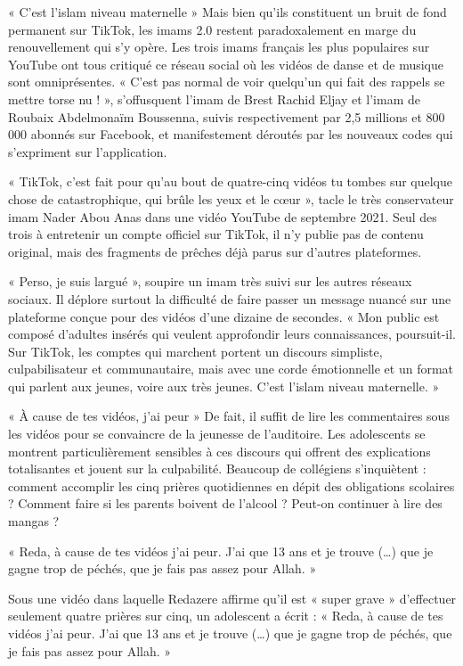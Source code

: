 « C’est l’islam niveau maternelle »
Mais bien qu’ils constituent un bruit de fond permanent sur TikTok, les imams 2.0 restent paradoxalement en marge du renouvellement qui s’y opère. Les trois imams français les plus populaires sur YouTube ont tous critiqué ce réseau social où les vidéos de danse et de musique sont omniprésentes. « C’est pas normal de voir quelqu’un qui fait des rappels se mettre torse nu ! », s’offusquent l’imam de Brest Rachid Eljay et l’imam de Roubaix Abdelmonaïm Boussenna, suivis respectivement par 2,5 millions et 800 000 abonnés sur Facebook, et manifestement déroutés par les nouveaux codes qui s’expriment sur l’application.
 
« TikTok, c’est fait pour qu’au bout de quatre-cinq vidéos tu tombes sur quelque chose de catastrophique, qui brûle les yeux et le cœur », tacle le très conservateur imam Nader Abou Anas dans une vidéo YouTube de septembre 2021. Seul des trois à entretenir un compte officiel sur TikTok, il n’y publie pas de contenu original, mais des fragments de prêches déjà parus sur d’autres plateformes.
 
« Perso, je suis largué », soupire un imam très suivi sur les autres réseaux sociaux. Il déplore surtout la difficulté de faire passer un message nuancé sur une plateforme conçue pour des vidéos d’une dizaine de secondes. « Mon public est composé d’adultes insérés qui veulent approfondir leurs connaissances, poursuit-il. Sur TikTok, les comptes qui marchent portent un discours simpliste, culpabilisateur et communautaire, mais avec une corde émotionnelle et un format qui parlent aux jeunes, voire aux très jeunes. C’est l’islam niveau maternelle. »

« À cause de tes vidéos, j’ai peur »
De fait, il suffit de lire les commentaires sous les vidéos pour se convaincre de la jeunesse de l’auditoire. Les adolescents se montrent particulièrement sensibles à ces discours qui offrent des explications totalisantes et jouent sur la culpabilité. Beaucoup de collégiens s’inquiètent : comment accomplir les cinq prières quotidiennes en dépit des obligations scolaires ? Comment faire si les parents boivent de l’alcool ? Peut-on continuer à lire des mangas ?

« Reda, à cause de tes vidéos j’ai peur. J’ai que 13 ans et je trouve (…) que je gagne trop de péchés, que je fais pas assez pour Allah. »
 

Sous une vidéo dans laquelle Redazere affirme qu’il est « super grave » d’effectuer seulement quatre prières sur cinq, un adolescent a écrit : « Reda, à cause de tes vidéos j’ai peur. J’ai que 13 ans et je trouve (…) que je gagne trop de péchés, que je fais pas assez pour Allah. »

